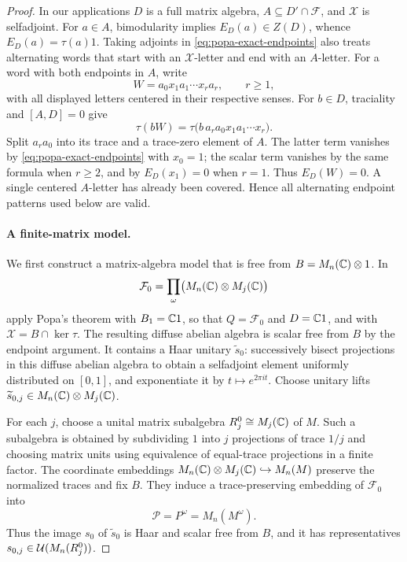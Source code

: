 \begin{proof}
In our applications $D$ is a full matrix algebra,
$A\subseteq D'\cap\mathcal F$, and $\mathcal X$ is selfadjoint.
For $a\in A$, bimodularity implies $E_D(a)\in Z(D)$, whence
$E_D(a)=\tau(a)1$.  Taking adjoints in
\eqref{eq:popa-exact-endpoints} also treats alternating words that
start with an $\mathcal X$-letter and end with an $A$-letter.
For a word with both endpoints in $A$, write
\[
 W=a_0x_1a_1\cdots x_ra_r,
 \qquad r\geq1,
\]
with all displayed letters centered in their respective senses.
For $b\in D$, traciality and $[A,D]=0$ give
\[
 \tau(bW)=\tau\bigl(b\,a_ra_0x_1a_1\cdots x_r\bigr).
\]
Split $a_ra_0$ into its trace and a trace-zero element of $A$.
The latter term vanishes by \eqref{eq:popa-exact-endpoints} with
$x_0=1$; the scalar term vanishes by the same formula when $r\geq2$,
and by $E_D(x_1)=0$ when $r=1$.  Thus $E_D(W)=0$.
A single centered $A$-letter has already been covered.  Hence all
alternating endpoint patterns used below are valid.

\paragraph{A finite-matrix model.}
We first construct a matrix-algebra model that is free from
$B=M_n(\mathbb C)\otimes1$.  In
\[
 \mathcal F_0=\prod_\omega\bigl(M_n(\mathbb C)\otimes M_j(\mathbb C)\bigr)
\]
apply Popa's theorem with $B_1=\mathbb C1$, so that $Q=\mathcal F_0$ and
$D=\mathbb C1$, and with $\mathcal X=B\cap\ker\tau$.
The resulting diffuse abelian algebra is scalar free from $B$ by
the endpoint argument.  It contains a Haar unitary $\widetilde s_0$:
successively bisect projections in this diffuse abelian algebra to
obtain a selfadjoint element uniformly distributed on $[0,1]$, and
exponentiate it by $t\mapsto e^{2\pi it}$.
Choose unitary lifts
$\widetilde s_{0,j}\in M_n(\mathbb C)\otimes M_j(\mathbb C)$.

For each $j$, choose a unital matrix subalgebra
$R_j^0\cong M_j(\mathbb C)$ of $M$.  Such a subalgebra is obtained by
subdividing $1$ into $j$ projections of trace $1/j$ and choosing
matrix units using equivalence of equal-trace projections in a
finite factor.  The coordinate embeddings
$M_n(\mathbb C)\otimes M_j(\mathbb C)\hookrightarrow M_n(M)$ preserve the
normalized traces and fix $B$.  They induce a trace-preserving
embedding of $\mathcal F_0$ into
\[
 \mathcal P=P^\omega=M_n(M^\omega).
\]
Thus the image $s_0$ of $\widetilde s_0$ is Haar and scalar free
from $B$, and it has representatives
$s_{0,j}\in\mathcal U(M_n(R_j^0))$.


\end{proof}
